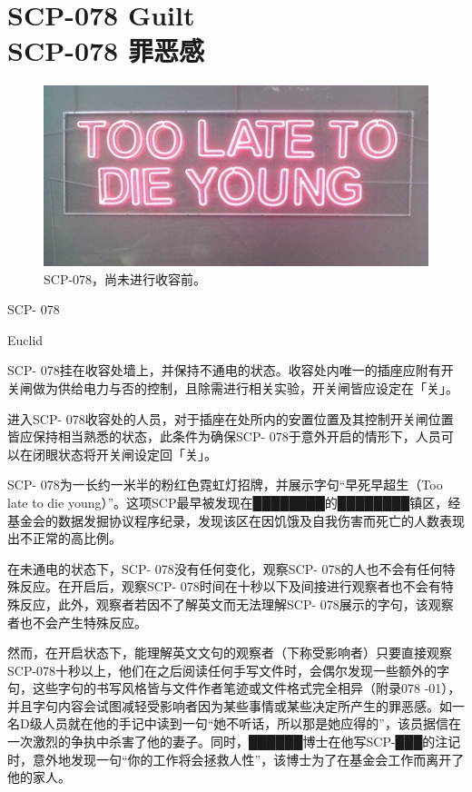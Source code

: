 \chapter[SCP-078 罪恶感]{
    SCP-078 Guilt\\
    SCP-078 罪恶感
}

\label{chap:SCP-078}

\begin{figure}[H]
    \centering
    \includegraphics[width=0.5\linewidth]{images/SCP-078.jpg}
    \caption*{SCP-078，尚未进行收容前。}
\end{figure}

SCP- 078

Euclid

SCP- 078挂在收容处墙上，并保持不通电的状态。收容处内唯一的插座应附有开关闸做为供给电力与否的控制，且除需进行相关实验，开关闸皆应设定在「关」。

进入SCP- 078收容处的人员，对于插座在处所内的安置位置及其控制开关闸位置皆应保持相当熟悉的状态，此条件为确保SCP- 078于意外开启的情形下，人员可以在闭眼状态将开关闸设定回「关」。

SCP- 078为一长约一米半的粉红色霓虹灯招牌，并展示字句“早死早超生（Too late to die young）”。这项SCP最早被发现在████████的████████镇区，经基金会的数据发掘协议程序纪录，发现该区在因饥饿及自我伤害而死亡的人数表现出不正常的高比例。

在未通电的状态下，SCP- 078没有任何变化，观察SCP- 078的人也不会有任何特殊反应。在开启后，观察SCP- 078时间在十秒以下及间接进行观察者也不会有特殊反应，此外，观察者若因不了解英文而无法理解SCP- 078展示的字句，该观察者也不会产生特殊反应。

然而，在开启状态下，能理解英文文句的观察者（下称受影响者）只要直接观察SCP-078十秒以上，他们在之后阅读任何手写文件时，会偶尔发现一些额外的字句，这些字句的书写风格皆与文件作者笔迹或文件格式完全相异（附录078 -01），并且字句内容会试图减轻受影响者因为某些事情或某些决定所产生的罪恶感。如一名D级人员就在他的手记中读到一句“她不听话，所以那是她应得的”，该员据信在一次激烈的争执中杀害了他的妻子。同时，██████博士在他写SCP-███的注记时，意外地发现一句“你的工作将会拯救人性”，该博士为了在基金会工作而离开了他的家人。

